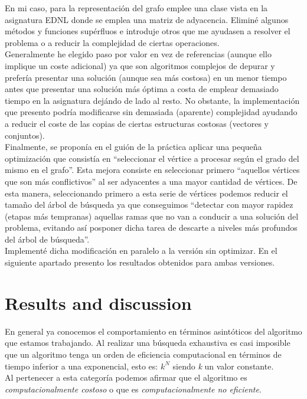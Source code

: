 \documentclass[british,a4paper,11pt,titlepage]{article}
\begin{document}
    En mi caso, para la representación del grafo emplee una clase vista en la asignatura EDNL donde se emplea una matriz de adyacencia. Eliminé algunos métodos y funciones supérfluos e introduje otros que me ayudasen a resolver el problema o a reducir la complejidad de ciertas operaciones.
    \\
    Generalmente he elegido paso por valor en vez de referencias (aunque ello implique un coste adicional) ya que son algoritmos complejos de depurar y prefería presentar una solución (aunque sea más costosa) en un menor tiempo antes que presentar una solución más óptima a costa de emplear demasiado tiempo en la asignatura dejándo de lado al resto.
    No obstante, la implementación que presento podría modificarse sin demasiada (aparente) complejidad ayudando a reducir el coste de las copias de ciertas estructuras costosas (vectores y conjuntos).
    \\
    Finalmente, se proponía en el guión de la práctica aplicar una pequeña optimización que consistía en ``seleccionar el vértice a procesar según el grado del mismo en el grafo''. Esta mejora consiste en seleccionar primero ``aquellos vértices que son más conflictivos'' al ser adyacentes a una mayor cantidad de vértices. De esta manera, seleccionando primero a esta serie de vértices podemos reducir el tamaño del árbol de búsqueda ya que conseguimos ``detectar con mayor rapidez (etapas más tempranas) aquellas ramas que no van a conducir a una solución del problema, evitando así posponer dicha tarea de descarte a niveles más profundos del árbol de búsqueda''.
    \\
    Implementé dicha modificación en paralelo a la versión sin optimizar. En el siguiente apartado presento los resultados obtenidos para ambas versiones.

    \cleardoublepage

    \section{Results and discussion}
    \label{sec:results}
    En general ya conocemos el comportamiento en términos asintóticos del algoritmo que estamos trabajando. Al realizar una búsqueda exhaustiva es casi imposible que un algoritmo tenga un orden de eficiencia computacional en términos de tiempo inferior a una exponencial, esto es: $k^N$ siendo \emph{k} un valor constante.
    \\
    Al pertenecer a esta categoría podemos afirmar que el algoritmo es \emph{computacionalmente costoso} o que es \emph{computacionalmente no eficiente}.
\end{document}

